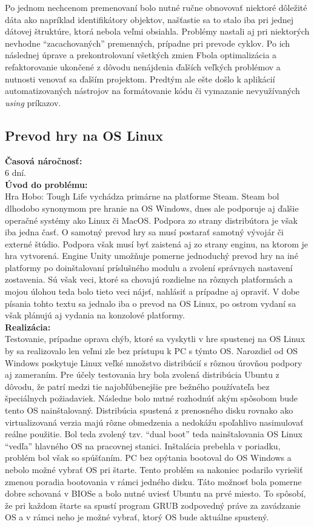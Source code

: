 \documentclass[slovak, bachelorpractice]{diploma}
\begin{document}
Po jednom nechcenom premenovaní bolo nutné ručne obnovovať niektoré dôležité dáta ako napríklad identifikátory objektov, našťastie sa to stalo iba pri jednej dátovej štruktúre, ktorá nebola veľmi obsiahla. Problémy nastali aj pri niektorých nevhodne \enquote{zacachovaných} premenných, prípadne pri prevode cyklov. Po ich následnej úprave a prekontrolovaní všetkých zmien Fbola optimalizácia a refaktorovanie ukončené z dôvodu nenájdenia ďalších veľkých problémov a nutnosti venovať sa ďalším projektom. Predtým ale ešte došlo k aplikácií automatizovaných nástrojov na formátovanie kódu či vymazanie nevyužívaných \textit{using} príkazov.

\subsection{Prevod hry na OS Linux}
\label{sec:linux}
\textbf{Časová náročnosť:} \\ 6 dní.\\
\textbf{Úvod do problému:} \\ Hra Hobo: Tough Life vychádza primárne na platforme Steam. Steam bol dlhodobo synonymom pre hranie na OS Windows, dnes ale podporuje aj ďalšie operačné systémy ako Linux či MacOS. Podpora zo strany distribútora je však iba jedna časť. O samotný prevod hry sa musí postarať samotný vývojár či externé štúdio. Podpora však musí byť zaistená aj zo strany enginu, na ktorom je hra vytvorená. Engine Unity umožňuje pomerne jednoduchý prevod hry na iné platformy po doinštalovaní príslušného modulu a zvolení správnych nastavení zostavenia. Sú však veci, ktoré sa chovajú rozdielne na rôznych platformách a mojou úlohou teda bolo tieto veci nájsť, nahlásiť a prípadne aj opraviť. V dobe písania tohto textu sa jednalo iba o prevod na OS Linux, po ostrom vydaní sa však plánujú aj vydania na konzolové platformy.\\
\textbf{Realizácia:} \\ Testovanie, prípadne oprava chýb, ktoré sa vyskytli v hre spustenej na OS Linux by sa realizovalo len veľmi zle bez prístupu k PC s týmto OS. Narozdiel od OS Windows poskytuje Linux veľké množstvo distribúcií s rôznou úrovňou podpory aj zameraním. Pre účely testovania hry bola zvolená distribúcia Ubuntu z dôvodu, že patrí medzi tie najobľúbenejšie pre bežného používateľa bez špeciálnych požiadaviek. Následne bolo nutné rozhodnúť akým spôsobom bude tento OS nainštalovaný. Distribúcia spustená z prenosného disku rovnako ako virtualizovaná verzia majú rôzne obmedzenia a nedokážu spoľahlivo nasimulovať reálne použitie. Bol teda zvolený tzv. \enquote{dual boot} teda nainštalovania OS Linux \enquote{vedľa} hlavného OS na pracovnej stanici. Inštalácia prebehla v poriadku, problém bol však so spúšťaním. PC bez opýtania bootoval do OS Windows a nebolo možné vybrať OS pri štarte. Tento problém sa nakoniec podarilo vyriešiť zmenou poradia bootovania v rámci jedného disku. Táto možnosť bola pomerne dobre schovaná v BIOSe a bolo nutné uviesť Ubuntu na prvé miesto. To spôsobí, že pri každom štarte sa spustí program GRUB zodpovedný práve za zavádzanie OS a v rámci neho je možné vybrať, ktorý OS bude aktuálne spustený.
\end{document}
